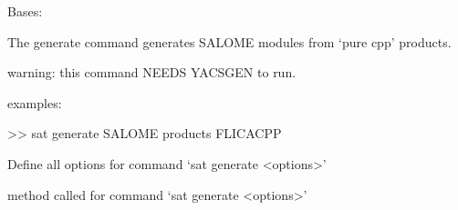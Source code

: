 \documentclass[a4paper,10pt,english]{sphinxmanual}
\begin{document}
\begin{fulllineitems}
\label{\detokenize{apidoc_commands/commands:commands.generate.Command}}
Bases: 

The generate command generates SALOME modules from ‘pure cpp’ products.

\begin{DUlineblock}{0em}
\item[] warning: this command NEEDS YACSGEN to run.
\item[] 
\item[] examples:
\item[] \textgreater{}\textgreater{} sat generate SALOME \textendash{}products FLICACPP
\end{DUlineblock}

\begin{fulllineitems}
\label{\detokenize{apidoc_commands/commands:commands.generate.Command.getParser}}
Define all options for command ‘sat generate \textless{}options\textgreater{}’

\end{fulllineitems}


\begin{fulllineitems}
\label{\detokenize{apidoc_commands/commands:commands.generate.Command.name}}
\end{fulllineitems}


\begin{fulllineitems}
\label{\detokenize{apidoc_commands/commands:commands.generate.Command.run}}
method called for command ‘sat generate \textless{}options\textgreater{}’

\end{fulllineitems}


\end{fulllineitems}
\end{document}
